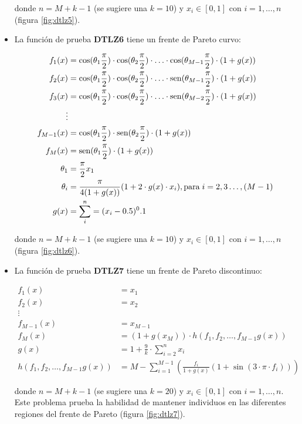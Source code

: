 \begin{itemize}
donde $n=M+k-1$ (se sugiere una $k=10$) y $x_i\in[0,1]$ con $i = 1,\ldots,n$ (figura \ref{fig:dtlz5}).

\item La funci\'on de prueba \textbf{DTLZ6} tiene un frente de Pareto curvo:

\begin{align*}
f_1(x)&=\cos(\theta_1\frac{\pi}{2})\cdot\cos(\theta_2\frac{\pi}{2})\cdot\ldots\cdot \cos(\theta_{M-1}\frac{\pi}{2})\cdot(1+g(x))\\
f_2(x)&=\cos(\theta_1\frac{\pi}{2})\cdot\cos(\theta_2\frac{\pi}{2})\cdot\ldots\cdot \sin(\theta_{M-1}\frac{\pi}{2})\cdot(1+g(x))\\
f_3(x)&=\cos(\theta_1\frac{\pi}{2})\cdot\cos(\theta_2\frac{\pi}{2})\cdot\ldots\cdot \sin(\theta_{M-2}\frac{\pi}{2})\cdot(1+g(x))\\
\vdots&\\
f_{M-1}(x)&=\cos(\theta_1\frac{\pi}{2})\cdot\sin(\theta_2\frac{\pi}{2})\cdot(1+g(x))\\
f_{M}(x)&=\sin(\theta_1\frac{\pi}{2})\cdot(1+g(x))\\
\theta_1&=\frac{\pi}{2}x_1\\
\theta_i&=\frac{\pi}{4(1+g(x))}(1+2\cdot g(x)\cdot x_i),  \text{para}\hspace{1mm} i=2,3\dots,(M-1)\\
g(x)&=\sum^n_i=(x_i-0.5)^0.1
\end{align*}

donde $n=M+k-1$ (se sugiere una $k=10$) y $x_i\in[0,1]$ con $i=1,\ldots,n$ (figura \ref{fig:dtlz6}).

\item La funci\'on de prueba \textbf{DTLZ7} tiene un frente de Pareto discontinuo:

\begin{align*}
f_1(x)&=x_1 \\
f_2(x)&=x_2\\
\vdots&\\
f_{M-1}(x)&=x_{M-1}\\
f_{M}(x)&=(1+g(x_M))\cdot h(f_1,f_2,\dots,f_{M-1}g(x))\\
g(x)&=1+\frac{9}{k}\cdot\sum_{i=2}^nx_i\\
h(f_1,f_2,\dots,f_{M-1}g(x))&=M-\sum_{i=1}^{M-1}(\frac{f_i}{1+g(x)}(1+\sin{(3\cdot\pi\cdot f_i)}))
\end{align*}

donde $n=M+k-1$ (se sugiere una $k=20$) y $x_i\in[0,1]$ con $i=1,\ldots,n$. Este problema prueba la habilidad de mantener 
individuos en las diferentes regiones del frente de Pareto (figura \ref{fig:dtlz7}).

\end{itemize}


